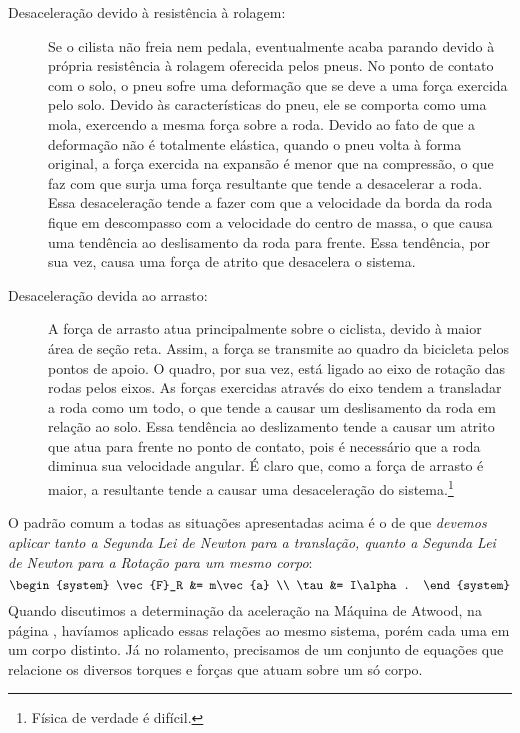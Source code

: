 \begin{description}
    \item[Desaceleração devido à resistência à rolagem:] Se o cilista não freia nem pedala, eventualmente acaba parando devido à própria resistência à rolagem oferecida pelos pneus. No ponto de contato com o solo, o pneu sofre uma deformação que se deve a uma força exercida pelo solo. Devido às características do pneu, ele se comporta como uma mola, exercendo a mesma força sobre a roda. Devido ao fato de que a deformação não é totalmente elástica, quando o pneu volta à forma original, a força exercida na expansão é menor que na compressão, o que faz com que surja uma força resultante que tende a desacelerar a roda. Essa desaceleração tende a fazer com que a velocidade da borda da roda fique em descompasso com a velocidade do centro de massa, o que causa uma tendência ao deslisamento da roda para frente. Essa tendência, por sua vez, causa uma força de atrito que desacelera o sistema.
    \item[Desaceleração devida ao arrasto:] A força de arrasto atua principalmente sobre o ciclista, devido à maior área de seção reta. Assim, a força se transmite ao quadro da bicicleta pelos pontos de apoio. O quadro, por sua vez, está ligado ao eixo de rotação das rodas pelos eixos. As forças exercidas através do eixo tendem a transladar a roda como um todo, o que tende a causar um deslisamento da roda em relação ao solo. Essa tendência ao deslizamento tende a causar um atrito que atua para frente no ponto de contato, pois é necessário que a roda diminua sua velocidade angular. É claro que, como a força de arrasto é maior, a resultante tende a causar uma desaceleração do sistema.\footnote{Física de verdade é difícil.}
\end{description}

O padrão comum a todas as situações apresentadas acima é o de que \emph{devemos aplicar tanto a Segunda Lei de Newton para a translação, quanto a Segunda Lei de Newton para a Rotação para um mesmo corpo}:
\begin{equation}
\begin{system}
    \vec{F}_R &= m\vec{a} \\
    \tau &= I\alpha.
\end{system}
\end{equation}
%
Quando discutimos a determinação da aceleração na Máquina de Atwood, na página \pageref{Par:AcelMaqAtwood}, havíamos aplicado essas relações ao mesmo sistema, porém cada uma em um corpo distinto. Já no rolamento, precisamos de um conjunto de equações que relacione os diversos torques e forças que atuam sobre um só corpo.

